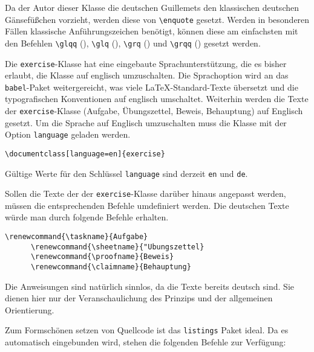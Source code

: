 \documentclass{exercise}
\begin{document}
    Da der Autor dieser Klasse die deutschen Guillemets den klassischen deutschen Gänsefüßchen vorzieht, werden diese von \lstinline-\enquote- gesetzt. Werden in besonderen Fällen klassische Anführungszeichen benötigt, können diese am einfachsten mit den Befehlen \lstinline-\glqq- (\glqq), \lstinline-\glq- (\glq), \lstinline-\grq- (\grq) und \lstinline-\grqq- (\grqq) gesetzt werden.
    
    Die \texttt{exercise}-Klasse hat eine eingebaute Sprachunterstützung, die es bisher erlaubt, die Klasse auf englisch umzuschalten. Die Sprachoption wird an das \texttt{babel}-Paket \cite{babel} weitergereicht, was viele \LaTeX{}-Standard-Texte übersetzt und die typografischen Konventionen auf englisch umschaltet. Weiterhin werden die Texte der \texttt{exercise}-Klasse (Aufgabe, Übungszettel, Beweis, Behauptung) auf Englisch gesetzt. Um die Sprache auf Englisch umzuschalten muss die Klasse mit der Option \lstinline{language} geladen werden.
    \begin{lstlisting}[gobble=6]
      \documentclass[language=en]{exercise}
    \end{lstlisting}
    Gültige Werte für den Schlüssel \lstinline{language} sind derzeit \lstinline{en} und \lstinline{de}.
    
    Sollen die Texte der der \texttt{exercise}-Klasse darüber hinaus angepasst werden, müssen die entsprechenden Befehle umdefiniert werden. Die deutschen Texte würde man durch folgende Befehle erhalten.
    \begin{lstlisting}[gobble=6]
      \renewcommand{\taskname}{Aufgabe}
      \renewcommand{\sheetname}{"Ubungszettel}
      \renewcommand{\proofname}{Beweis}
      \renewcommand{\claimname}{Behauptung}
    \end{lstlisting}
    Die Anweisungen sind natürlich sinnlos, da die Texte bereits deutsch sind. Sie dienen hier nur der Veranschaulichung des Prinzips und der allgemeinen Orientierung.
    
    
    Zum Formschönen setzen von Quellcode ist das \texttt{listings} Paket
    \cite{listings} ideal. Da es automatisch eingebunden wird, stehen die
    folgenden Befehle zur Verfügung:
    
\end{document}
